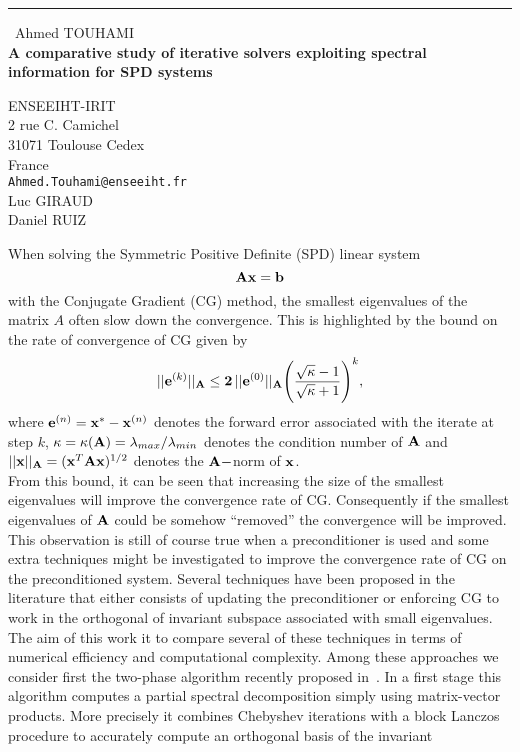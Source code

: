 \documentclass{report}
\begin{document}
\begin{center}
\rule{6in}{1pt} \
{\large Ahmed TOUHAMI \\
{\bf A comparative study of iterative solvers exploiting spectral information for SPD systems}}

ENSEEIHT-IRIT \\ 2 rue C. Camichel \\ 31071 Toulouse Cedex \\ France
\\
{\tt Ahmed.Touhami@enseeiht.fr}\\
Luc GIRAUD\\
Daniel RUIZ\end{center}


When solving the Symmetric Positive Definite (SPD) linear system
$${\bf A x}= {\bf b} $$
with the Conjugate Gradient (CG) method, the smallest eigenvalues of the
matrix $A$ often slow down the convergence.
This is highlighted by the bound on the rate of convergence of CG given by
$$ ||{\bf e}^{(k)}||_{\bf A} \le {\bf 2}\,||{\bf e}^{(0)}||_{\bf A}
\displaystyle\Bigg(\frac{\sqrt \kappa -1}{\sqrt \kappa + 1}\Bigg)^k,$$
where ${\bf e}^{(n)}= {\bf x}^* - {\bf x}^{(n)}$ denotes the forward
error associated with the iterate at step $k$, $\displaystyle \kappa =
\kappa({\bf A}) = \lambda_{max} / \lambda_{min}$ denotes the condition
number of ${\bf A}$ and $||{\bf x}||_{{\bf A}} = ({\bf x}^T{\bf A}{\bf
x})^{1/2}$ denotes the ${\bf A-}$norm of ${\bf x}$. \\
From this bound, it can be seen that increasing the size of the smallest
eigenvalues will improve the convergence rate of CG.
Consequently if the smallest eigenvalues of ${\bf A}$ could be somehow
``removed'' the convergence will be improved.
This observation is still of course true when a preconditioner is used and some
extra techniques might be investigated to improve the convergence rate of
CG on the preconditioned system.
Several techniques have been proposed in the literature that either consists of
updating the preconditioner or enforcing CG to work in the orthogonal of
invariant subspace associated with small eigenvalues.
The aim of this work it to compare several of these techniques in terms
of numerical efficiency and computational complexity.
Among these approaches we consider first the two-phase algorithm recently
proposed in~\cite{arru:02}.
In a first stage this algorithm computes a partial spectral decomposition
simply using matrix-vector products.
More precisely it combines Chebyshev iterations with a block Lanczos
procedure to accurately compute an orthogonal basis of the invariant
\end{document}
